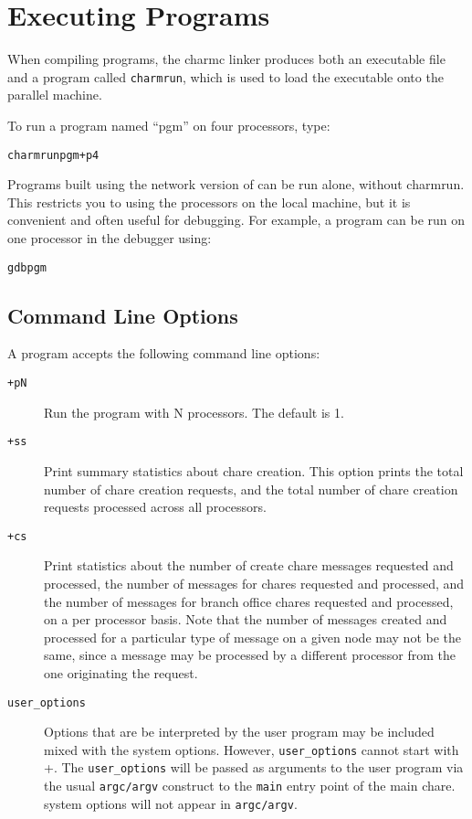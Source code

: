 \section{Executing \charmpp{} Programs}
\label{executing charm programs}

When compiling \charmpp{} programs, the charmc linker produces 
both an executable file and a program called {\tt charmrun},
which is used to load the executable onto the parallel machine.

To run a \charmpp{} program named ``pgm'' on four processors, type:
\begin{alltt}
charmrun pgm +p4
\end{alltt}


Programs built using the network version of \charmpp{} can be run
alone, without charmrun.  This restricts you to using the processors
on the local machine, but it is convenient and often useful for
debugging.  For example, a \charmpp{} program can be run on one
processor in the debugger using:

\begin{alltt}
gdb pgm
\end{alltt}

\subsection[Command Line Options]{Command Line Options}
\label{command line options}

A \charmpp{} program accepts the following command line options:
\begin{description}

\item[{\tt +pN}] Run the program with N processors. The default is 1.

\item[{\tt +ss}] Print summary statistics about chare creation.  This option
prints the total number of chare creation requests, and the total number of
chare creation requests processed across all processors.

\item[{\tt +cs}] Print statistics about the number of create chare messages
requested and processed, the number of messages for chares requested and 
processed, and the number of messages for branch office chares requested and
processed, on a per processor basis.  Note that the number of messages 
created and processed for a particular type of message on a given node 
may not be the same, since a message may be processed by a different
processor from the one originating the request.

\item[{\tt user\_options}] Options that are be interpreted by the user
program may be included mixed with the system options. 
However, {\tt user\_options} cannot start with +.
The {\tt user\_options} will be passed as arguments to the user program 
via the usual {\tt argc/argv} construct to the {\tt main}
entry point of the main chare. 
\charmpp{} system options will not appear in {\tt argc/argv}.

\end{description}



